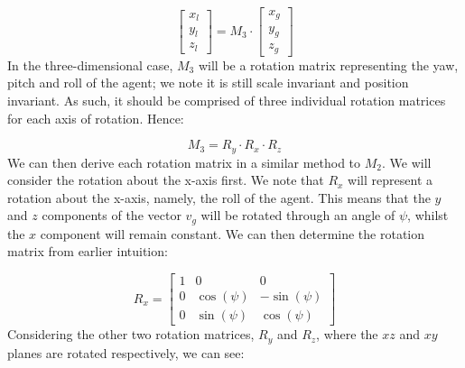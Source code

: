 \documentclass[12pt]{article}
\begin{document}
\begin{equation}
   \begin{bmatrix}
    x_l \\
    y_l \\
    z_l
    \end{bmatrix}
    = M_3 \cdot
    \begin{bmatrix}
    x_g \\
    y_g \\
    z_g
    \end{bmatrix}
\label{eq:basis-transformation}
\end{equation}
In the three-dimensional case, $M_3$ will be a rotation matrix representing the yaw, pitch and roll of the agent; we note it is still scale invariant and position invariant. As such, it should be comprised of three individual rotation matrices for each axis of rotation. Hence:

\begin{equation}
    M_3 = R_y \cdot R_x \cdot R_z
\end{equation}
We can then derive each rotation matrix in a similar method to $M_2$. We will consider the rotation about the x-axis first. We note that $R_x$ will represent a rotation about the x-axis, namely, the roll of the agent. This means that the $y$ and $z$ components of the vector $v_g$ will be rotated through an angle of $\psi$, whilst the $x$ component will remain constant. We can then determine the rotation matrix from earlier intuition:

\begin{equation}
    R_x =
    \begin{bmatrix}
        1 & 0 & 0 \\
        0 & \cos(\psi) & -\sin(\psi) \\
        0 & \sin(\psi) & \cos(\psi)
    \end{bmatrix}
\end{equation}
Considering the other two rotation matrices, $R_y$ and $R_z$, where the $xz$ and $xy$ planes are rotated respectively, we can see:
\end{document}
